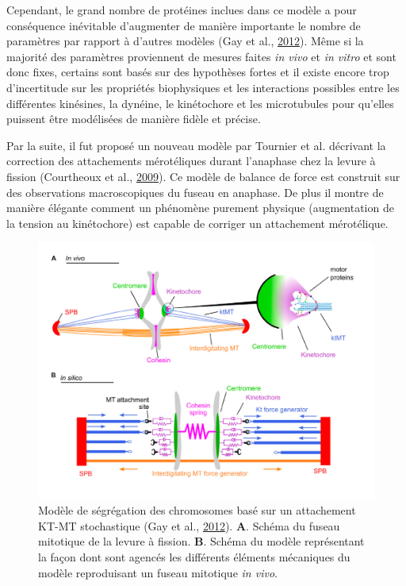 \documentclass[12pt,a4paper,twoside,openright]{book}
\begin{document}
Cependant, le grand nombre de protéines inclues dans ce modèle a pour
conséquence inévitable d'augmenter de manière importante le nombre de
paramètres par rapport à d'autres modèles (Gay et al.,
\hyperref[ref-Gay2012a]{2012}). Même si la majorité des paramètres
proviennent de mesures faites \emph{in vivo} et \emph{in vitro} et sont
donc fixes, certains sont basés sur des hypothèses fortes et il existe
encore trop d'incertitude sur les propriétés biophysiques et les
interactions possibles entre les différentes kinésines, la dynéine, le
kinétochore et les microtubules pour qu'elles puissent être modélisées
de manière fidèle et précise.

Par la suite, il fut proposé un nouveau modèle par Tournier et al.
décrivant la correction des attachements mérotéliques durant l'anaphase
chez la levure à fission (Courtheoux et al.,
\hyperref[ref-Courtheoux2009]{2009}). Ce modèle de balance de force est
construit sur des observations macroscopiques du fuseau en anaphase. De
plus il montre de manière élégante comment un phénomène purement
physique (augmentation de la tension au kinétochore) est capable de
corriger un attachement mérotélique.

\begin{figure}[htbp]
\centering
\includegraphics{figures/intro/gay.png}
\caption[Modèle de ségrégation des chromosomes]{\label{fig:gay}Modèle de
ségrégation des chromosomes basé sur un attachement KT-MT stochastique
(Gay et al., \hyperref[ref-Gay2012a]{2012}). \textbf{A}. Schéma du
fuseau mitotique de la levure à fission. \textbf{B}. Schéma du modèle
représentant la façon dont sont agencés les différents éléments
mécaniques du modèle reproduisant un fuseau mitotique \emph{in vivo}.}
\end{figure}
\end{document}
